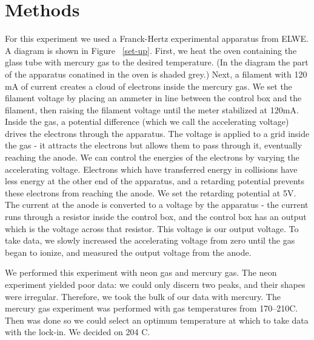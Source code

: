 \documentclass[prb,preprint]{revtex4-1}
\begin{document}
\section{Methods}

For this experiment we used a Franck-Hertz experimental apparatus from ELWE. A diagram is shown in Figure ~\ref{set-up}. 
First, we heat the oven containing the glass tube with mercury gas to the desired temperature. 
(In the diagram the part of the apparatus conatined in the oven is shaded grey.) 
Next, a filament with 120 mA of current creates a cloud of electrons inside the mercury gas. 
We set the filament voltage by placing an ammeter in line between the control box and the filament, then raising the filament voltage until the meter stabilized at 120mA. 
Inside the gas, a potential difference (which we call the accelerating voltage) drives the electrons through the apparatus. 
The voltage is applied to a grid inside the gas - it attracts the electrons but allows them to pass through it, eventually reaching the anode. 
We can control the energies of the electrons by varying the accelerating voltage. 
Electrons which have transferred energy in collisions have less energy at the other end of the apparatus, and a retarding potential prevents these electrons from reaching the anode. 
We set the retarding potential at 5V. %
The current at the anode is converted to a voltage by the apparatus - the current runs through a resistor inside the control box, and the control box has an output which is the voltage across that resistor. 
This voltage is our output voltage. 
To take data, we slowly increased the accelerating voltage from zero until the gas began to ionize, and measured the output voltage from the anode. 

We performed this experiment with neon gas and mercury gas. 
The neon experiment yielded poor data: we could only discern two peaks, and their shapes were irregular. 
Therefore, we took the bulk of our data with mercury. 
The mercury gas experiment was performed with gas temperatures from 170\degree--210\degree C. 
Then was done so we could select an optimum temperature at which to take data with the lock-in. 
We decided on 204 \degree C. 
\end{document}
